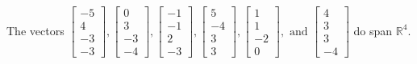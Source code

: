 \begin{exercise}
\begin{exerciseStatement}
  \end{exerciseStatement}
  \begin{exerciseAnswer}
   The vectors \(\left[\begin{array}{r}
-5 \\
4 \\
-3 \\
-3
\end{array}\right] , \left[\begin{array}{r}
0 \\
3 \\
-3 \\
-4
\end{array}\right] , \left[\begin{array}{r}
-1 \\
-1 \\
2 \\
-3
\end{array}\right] , \left[\begin{array}{r}
5 \\
-4 \\
3 \\
3
\end{array}\right] , \left[\begin{array}{r}
1 \\
1 \\
-2 \\
0
\end{array}\right] , \text{ and } \left[\begin{array}{r}
4 \\
3 \\
3 \\
-4
\end{array}\right]\) 
  	 do  
	span \(\mathbb{R}^4\).
  


  \end{exerciseAnswer}
\end{exercise}